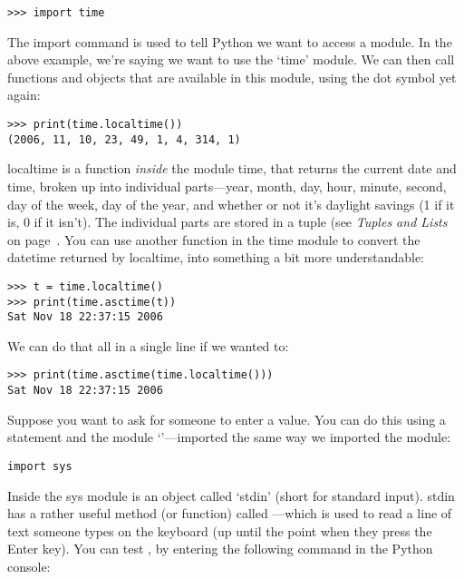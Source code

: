 \begin{Verbatim}[frame=single]
>>> import time
\end{Verbatim}

The import command is used to tell Python we want to access a module.  In the above example, we're saying we want to use the `time' module. We can then call functions and objects that are available in this module, using the dot symbol yet again:

\begin{Verbatim}[frame=single]
>>> print(time.localtime())
(2006, 11, 10, 23, 49, 1, 4, 314, 1)
\end{Verbatim}

localtime is a function \emph{inside} the module time, that returns the current date and time, broken up into individual parts---year, month, day, hour, minute, second, day of the week, day of the year, and whether or not it's daylight savings (1 if it is, 0 if it isn't).  The individual parts are stored in a tuple (see \emph{Tuples and Lists} on page~\pageref{tuplesandlists}.  You can use another function in the time module to convert the datetime returned by localtime, into something a bit more understandable:

\begin{Verbatim}[frame=single]
>>> t = time.localtime()
>>> print(time.asctime(t))
Sat Nov 18 22:37:15 2006
\end{Verbatim}

\noindent
We can do that all in a single line if we wanted to:

\begin{Verbatim}[frame=single]
>>> print(time.asctime(time.localtime()))
Sat Nov 18 22:37:15 2006
\end{Verbatim}

Suppose you want to ask for someone to enter a value. You can do this using a  statement and the module `'---imported the same way we imported the  module:

\begin{Verbatim}[frame=single]
import sys
\end{Verbatim}

Inside the sys module is an object called `stdin' (short for standard input).  stdin has a rather useful method (or function) called ---which is used to read a line of text someone types on the keyboard (up until the point when they press the Enter key).  You can test , by entering the following command in the Python console:

